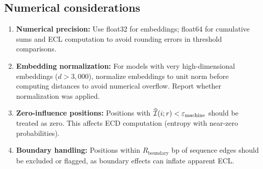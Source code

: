 \subsection{Numerical considerations}

\begin{enumerate}[leftmargin=2em, label=(\roman*)]
\item \textbf{Numerical precision:} Use float32 for embeddings; float64 for cumulative sums and ECL computation to avoid rounding errors in threshold comparisons.
\item \textbf{Embedding normalization:} For models with very high-dimensional embeddings ($d > 3{,}000$), normalize embeddings to unit norm before computing distances to avoid numerical overflow. Report whether normalization was applied.
\item \textbf{Zero-influence positions:} Positions with $\widehat{\mathcal{I}}(i;r) < \varepsilon_{\mathrm{machine}}$ should be treated as zero. This affects ECD computation (entropy with near-zero probabilities).
\item \textbf{Boundary handling:} Positions within $R_{\mathrm{boundary}}$ bp of sequence edges should be excluded or flagged, as boundary effects can inflate apparent ECL.
\end{enumerate}
